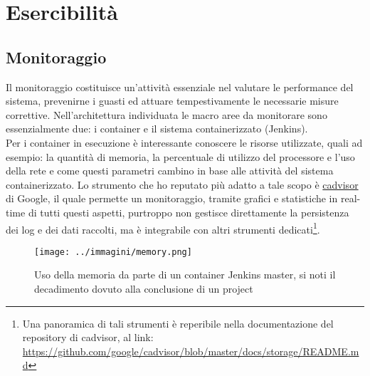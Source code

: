 
\pagestyle{IHA-fancy-style}
\chapter{Esercibilità}
\label{cap:esercibilità}


\section{Monitoraggio}
\label{sec:monitoring}

Il monitoraggio costituisce un'attività essenziale nel valutare le performance del sistema, prevenirne i guasti ed attuare tempestivamente le necessarie misure correttive. Nell'architettura individuata le macro aree da monitorare sono essenzialmente due: i \gls{container} e il sistema containerizzato (Jenkins). \\
Per i \gls{container} in esecuzione è interessante conoscere le risorse utilizzate, quali ad esempio: la quantità di memoria, la percentuale di utilizzo del processore e l'uso della rete e come questi parametri cambino in base alle attività del sistema containerizzato. Lo strumento che ho reputato più adatto a tale scopo è \hyperref[subsec:cadvisor]{cadvisor} di Google, il quale permette un monitoraggio, tramite grafici e statistiche in real-time di tutti questi aspetti, purtroppo non gestisce direttamente la persistenza dei log e dei dati raccolti, ma è integrabile con altri strumenti dedicati\footnote{Una panoramica di tali strumenti è reperibile nella documentazione del repository di cadvisor, al link: \url{https://github.com/google/cadvisor/blob/master/docs/storage/README.md}}. 

\begin{figure}[H]
    \capstart
    \centering
    \captionsetup{justification=centering}
    \texttt{[image: ../immagini/memory.png]}
    \caption[Uso della memoria da parte di un container Jenkins \gls{master}]{Uso della memoria da parte di un container Jenkins \gls{master}, si noti il decadimento dovuto alla conclusione di un \gls{project}}
\end{figure}
 

